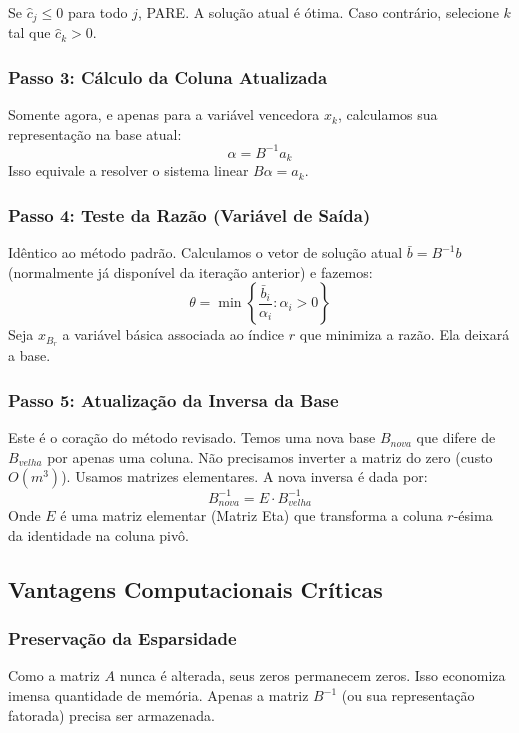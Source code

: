 \documentclass[12pt, a4paper]{article}
\begin{document}
Se $\hat{c}_j \le 0$ para todo $j$, PARE. A solução atual é ótima. Caso contrário, selecione $k$ tal que $\hat{c}_k > 0$.

\subsubsection{Passo 3: Cálculo da Coluna Atualizada}
Somente agora, e apenas para a variável vencedora $x_k$, calculamos sua representação na base atual:
\begin{equation}
    \alpha = B^{-1} a_k
\end{equation}
Isso equivale a resolver o sistema linear $B\alpha = a_k$.

\subsubsection{Passo 4: Teste da Razão (Variável de Saída)}
Idêntico ao método padrão. Calculamos o vetor de solução atual $\bar{b} = B^{-1}b$ (normalmente já disponível da iteração anterior) e fazemos:
\begin{equation}
    \theta = \min \left\{ \frac{\bar{b}_i}{\alpha_i} : \alpha_i > 0 \right\}
\end{equation}
Seja $x_{B_r}$ a variável básica associada ao índice $r$ que minimiza a razão. Ela deixará a base.

\subsubsection{Passo 5: Atualização da Inversa da Base}
Este é o coração do método revisado. Temos uma nova base $B_{nova}$ que difere de $B_{velha}$ por apenas uma coluna. Não precisamos inverter a matriz do zero (custo $O(m^3)$). Usamos matrizes elementares. A nova inversa é dada por:
\begin{equation}
    B_{nova}^{-1} = E \cdot B_{velha}^{-1}
\end{equation}
Onde $E$ é uma matriz elementar (Matriz Eta) que transforma a coluna $r$-ésima da identidade na coluna pivô.

\subsection{Vantagens Computacionais Críticas}

\subsubsection{Preservação da Esparsidade}
Como a matriz $A$ nunca é alterada, seus zeros permanecem zeros. Isso economiza imensa quantidade de memória. Apenas a matriz $B^{-1}$ (ou sua representação fatorada) precisa ser armazenada.
\end{document}

